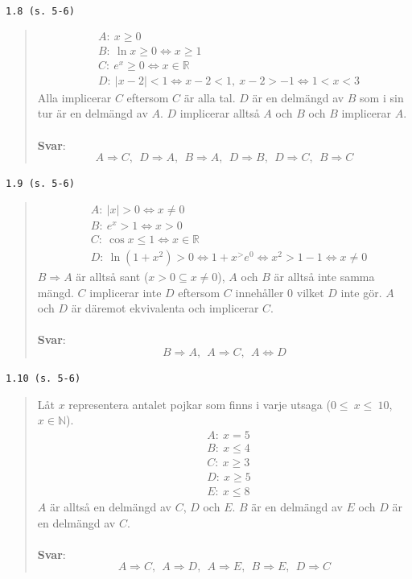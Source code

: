 \documentclass[a4paper]{article}
\newcommand{\tskcol}[1]{\textcolor{tskcol}{#1}}
\begin{document}
	\texttt{\tskcol{1.8 (s. 5-6)}}
	\begin{quotation}
		\begin{align*}
			& A:~x\ge 0 \\
			& B:~\ln x\ge 0 \Leftrightarrow x\ge 1 \\
			& C:~e^x \ge 0 \Leftrightarrow x \in \mathbb{R} \\
			& D:~|x-2|<1 \Leftrightarrow x-2<1,~x-2>-1 \Leftrightarrow 1<x<3
		\end{align*}
		\noindent
		Alla implicerar $C$ eftersom $C$ är alla tal. $D$ är en delmängd av $B$ som i sin tur är en delmängd av $A$. $D$ implicerar alltså $A$ och $B$ och $B$ implicerar $A$.
		\\ \\
		\textbf{Svar}: 
		\[A \Rightarrow C,~~ D \Rightarrow A,~~ B \Rightarrow A,~~ D \Rightarrow B,~~ D \Rightarrow C,~~ B \Rightarrow C\]
	\end{quotation}
	
	\pagebreak
	\texttt{\tskcol{1.9 (s. 5-6)}}
	\begin{quotation}
		\begin{align*}
			& A:~|x|>0 \Leftrightarrow x\neq 0\\
			& B:~e^x > 1 \Leftrightarrow x > 0\\
			& C:~\cos x \le 1 \Leftrightarrow x \in \mathbb{R}\\
			& D:~\ln(1+x^2)>0 \Leftrightarrow 1+x^>e^0 \Leftrightarrow x^2>1-1 \Leftrightarrow x\neq 0
		\end{align*}
		\noindent
		$B\Rightarrow A$ är alltså sant ($x > 0\subseteq x\neq 0$), $A$ och $B$ är alltså inte samma mängd. $C$ implicerar inte $D$ eftersom $C$ innehåller 0 vilket $D$ inte gör. $A$ och $D$ är däremot ekvivalenta och implicerar $C$.
		\\ \\
		\textbf{Svar}: 
		\[B \Rightarrow A,~~ A \Rightarrow C,~~ A \Leftrightarrow D\]
	\end{quotation}
	
	\texttt{\tskcol{1.10 (s. 5-6)}}
	\begin{quotation}
		\noindent
		Låt $x$ representera antalet pojkar som finns i varje utsaga ($0\le~x\le~10$, $x \in \mathbb{N}$).
		\begin{align*}
			& A:~x=5\\
			& B:~x\le 4\\
			& C:~x\ge 3\\
			& D:~x\ge 5\\
			& E:~x\le 8
		\end{align*}
		\noindent
		$A$ är alltså en delmängd av $C$, $D$ och $E$. $B$ är en delmängd av $E$ och $D$ är en delmängd av $C$.
		\\ \\
		\textbf{Svar}: 
		\[A \Rightarrow C,~~ A \Rightarrow D,~~ A \Rightarrow E,~~ B \Rightarrow E,~~ D \Rightarrow C\]
	\end{quotation}
	
\end{document}
